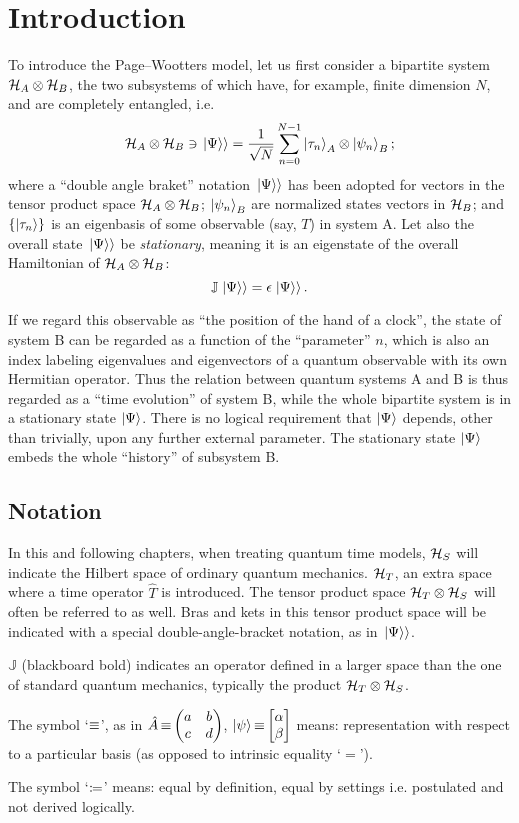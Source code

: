 \section{Introduction}

To introduce the Page--Wootters model, let us first consider
a bipartite system $\mathcal{H}_A \otimes \mathcal{H}_B$,
the two subsystems of which have, for example, finite dimension $N$,
and are completely
entangled, i.e.
$$
  \mathcal{H}_A \otimes \mathcal{H}_B \ni \left.\left| \Psi \right\rangle\right\rangle
  =
  \frac{1}{\sqrt{N}} \sum_{n=0}^{N-1} \ket{\tau_{n}}_{A} \otimes \ket{\psi_{n}}_{B} \text{;}
$$
where
a ``double angle braket'' notation $\left.\left| \Psi \right\rangle\right\rangle$ has been adopted
for vectors in the tensor product space $\mathcal{H}_A \otimes \mathcal{H}_B$;
$\ket{\psi_{n}}_{B}$ are normalized states vectors in $\mathcal{H}_B$;
and
$\qty{\ket{{\tau}_n}}$ is an eigenbasis of some observable (say, $T$) in system A.
Let also the overall state $\left.\left| \Psi \right\rangle\right\rangle$ be \emph{stationary}, meaning it is an eigenstate
of the overall Hamiltonian of $\mathcal{H}_A \otimes \mathcal{H}_B$:
$$
  \mathbb{J} \left.\left| \Psi \right\rangle\right\rangle = \epsilon \left.\left| \Psi \right\rangle\right\rangle \text{.}
$$

If we regard this observable as ``the position of the hand of a clock'',
the state of system B can be regarded as a function of the ``parameter'' $n$,
which is also an index labeling
eigenvalues and eigenvectors of a quantum observable
with its own Hermitian operator.
Thus the relation between quantum systems A and B is thus regarded as
a ``time evolution'' of system B,
while the whole bipartite system
is in a stationary state
$\ket{\Psi}$.
There is no logical requirement that $\ket{\Psi}$
depends, other than trivially,
upon any further external parameter.
The stationary state $\ket{\Psi}$ embeds the whole ``history''
of subsystem B.

\subsection*{Notation}

In this and following chapters, when treating quantum time models,
$\mathcal{H}_S$ will indicate the Hilbert space of ordinary quantum mechanics.
$\mathcal{H}_T$, an extra space where a time operator $\hat{T}$ is introduced. The tensor
product space $\mathcal{H}_T \otimes \mathcal{H}_S$
will often be referred to as well.
Bras and kets in this tensor product space will be indicated with a special double-angle-bracket
notation, as in $\left.\left| \Psi \right\rangle\right\rangle$.

${\mathbb{J}}$ (blackboard bold) indicates an  operator defined in
a larger space than the one of standard quantum mechanics,
typically the product $\mathcal{H}_T \otimes \mathcal{H}_S$.

The symbol `$\operatorname*{\equiv}$', as in $\hat{A} \repr \mqty(a&b\\c&d)$, $\ket{\psi} \repr \mqty[\alpha \\ \beta]$
means: representation with respect to a particular basis (as opposed to intrinsic equality `$=$').

The symbol `$\coloneqq$'
means: equal by definition, equal by settings i.e. postulated and not derived logically.
